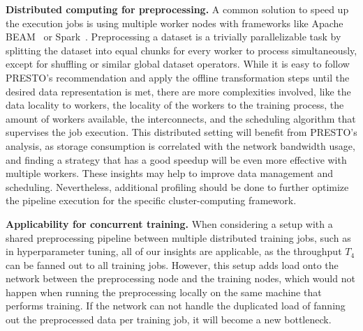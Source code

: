 \textbf{Distributed computing for preprocessing.}
A common solution to speed up the execution jobs is using multiple worker nodes with frameworks like Apache BEAM~\cite{beam} or Spark~\cite{zaharia2010spark}.
Preprocessing a dataset is a trivially parallelizable task by splitting the dataset into equal chunks for every worker to process simultaneously, except for shuffling or similar global dataset operators.
While it is easy to follow PRESTO's recommendation and apply the offline transformation steps until the desired data representation is met, there are more complexities involved, like the data locality to workers, the locality of the workers to the training process, the amount of workers available, the interconnects, and the scheduling algorithm that supervises the job execution.
This distributed setting will benefit from PRESTO's analysis, as storage consumption is correlated with the network bandwidth usage, and finding a strategy that has a good speedup will be even more effective with multiple workers. 
These insights may help to improve data management and scheduling.
Nevertheless, additional profiling should be done to further optimize the pipeline execution for the specific cluster-computing framework.

{\color{diff}
\textbf{Applicability for concurrent training.}
When considering a setup with a shared preprocessing pipeline between multiple distributed training jobs, such as in hyperparameter tuning, all of our insights are applicable, as the throughput $T_4$ can be fanned out to all training jobs. However, this setup adds load onto the network between the preprocessing node and the training nodes, which would not happen when running the preprocessing locally on the same machine that performs training. If the network can not handle the duplicated load of fanning out the preprocessed data per training job, it will become a new bottleneck.
}
